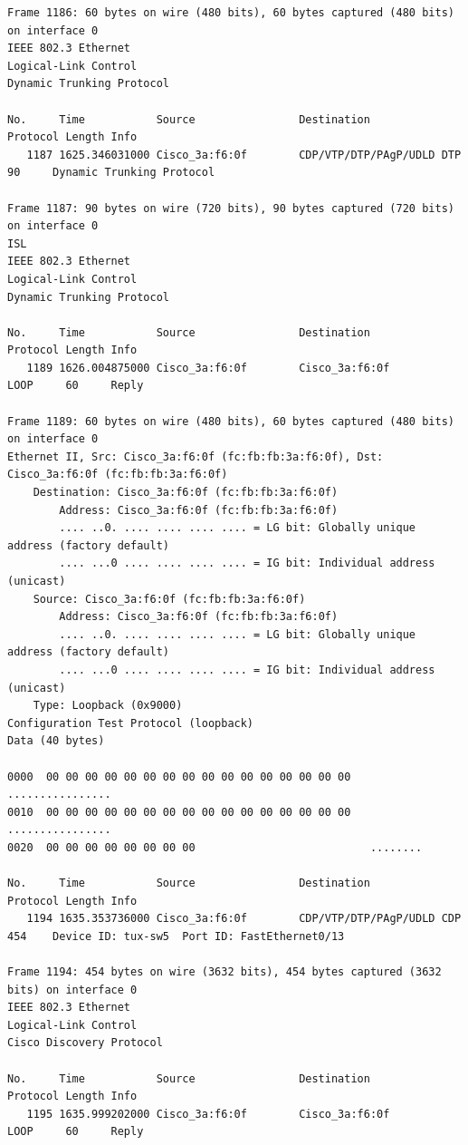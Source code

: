 \documentclass[a4paper,11pt]{article}
\begin{document}
\begin{lstlisting}
Frame 1186: 60 bytes on wire (480 bits), 60 bytes captured (480 bits) on interface 0
IEEE 802.3 Ethernet 
Logical-Link Control
Dynamic Trunking Protocol

No.     Time           Source                Destination           Protocol Length Info
   1187 1625.346031000 Cisco_3a:f6:0f        CDP/VTP/DTP/PAgP/UDLD DTP      90     Dynamic Trunking Protocol

Frame 1187: 90 bytes on wire (720 bits), 90 bytes captured (720 bits) on interface 0
ISL
IEEE 802.3 Ethernet 
Logical-Link Control
Dynamic Trunking Protocol

No.     Time           Source                Destination           Protocol Length Info
   1189 1626.004875000 Cisco_3a:f6:0f        Cisco_3a:f6:0f        LOOP     60     Reply

Frame 1189: 60 bytes on wire (480 bits), 60 bytes captured (480 bits) on interface 0
Ethernet II, Src: Cisco_3a:f6:0f (fc:fb:fb:3a:f6:0f), Dst: Cisco_3a:f6:0f (fc:fb:fb:3a:f6:0f)
    Destination: Cisco_3a:f6:0f (fc:fb:fb:3a:f6:0f)
        Address: Cisco_3a:f6:0f (fc:fb:fb:3a:f6:0f)
        .... ..0. .... .... .... .... = LG bit: Globally unique address (factory default)
        .... ...0 .... .... .... .... = IG bit: Individual address (unicast)
    Source: Cisco_3a:f6:0f (fc:fb:fb:3a:f6:0f)
        Address: Cisco_3a:f6:0f (fc:fb:fb:3a:f6:0f)
        .... ..0. .... .... .... .... = LG bit: Globally unique address (factory default)
        .... ...0 .... .... .... .... = IG bit: Individual address (unicast)
    Type: Loopback (0x9000)
Configuration Test Protocol (loopback)
Data (40 bytes)

0000  00 00 00 00 00 00 00 00 00 00 00 00 00 00 00 00   ................
0010  00 00 00 00 00 00 00 00 00 00 00 00 00 00 00 00   ................
0020  00 00 00 00 00 00 00 00                           ........

No.     Time           Source                Destination           Protocol Length Info
   1194 1635.353736000 Cisco_3a:f6:0f        CDP/VTP/DTP/PAgP/UDLD CDP      454    Device ID: tux-sw5  Port ID: FastEthernet0/13  

Frame 1194: 454 bytes on wire (3632 bits), 454 bytes captured (3632 bits) on interface 0
IEEE 802.3 Ethernet 
Logical-Link Control
Cisco Discovery Protocol

No.     Time           Source                Destination           Protocol Length Info
   1195 1635.999202000 Cisco_3a:f6:0f        Cisco_3a:f6:0f        LOOP     60     Reply


\end{lstlisting}
\end{document}
